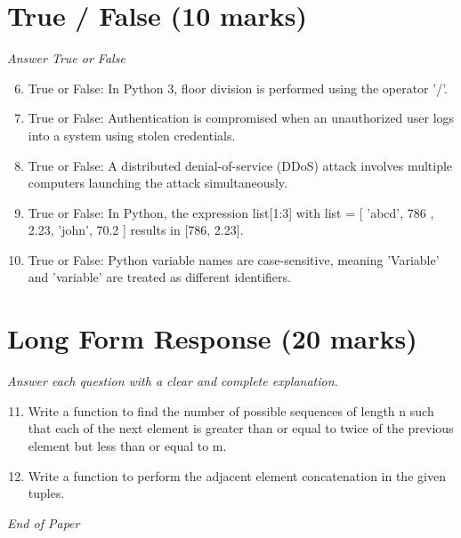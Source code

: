 \documentclass[12pt]{article}
\begin{document}
\section*{True / False (10 marks)}
\textit{Answer True or False}
\begin{enumerate}[label=\arabic*.]
\setcounter{enumi}{5}
\item True or False: In Python 3, floor division is performed using the operator '/'.
\item True or False: Authentication is compromised when an unauthorized user logs into a system using stolen credentials.
\item True or False: A distributed denial-of-service (DDoS) attack involves multiple computers launching the attack simultaneously.
\item True or False: In Python, the expression list[1:3] with list = [ 'abcd', 786 , 2.23, 'john', 70.2 ] results in [786, 2.23].
\item True or False: Python variable names are case-sensitive, meaning 'Variable' and 'variable' are treated as different identifiers.
\end{enumerate}

\section*{Long Form Response (20 marks)}
\textit{Answer each question with a clear and complete explanation.}
\begin{enumerate}[label=\arabic*.]
\setcounter{enumi}{10}
\item Write a function to find the number of possible sequences of length n such that each of the next element is greater than or equal to twice of the previous element but less than or equal to m.
\item Write a function to perform the adjacent element concatenation in the given tuples.
\end{enumerate}

\vfill
\noindent\textit{End of Paper}
\end{document}
